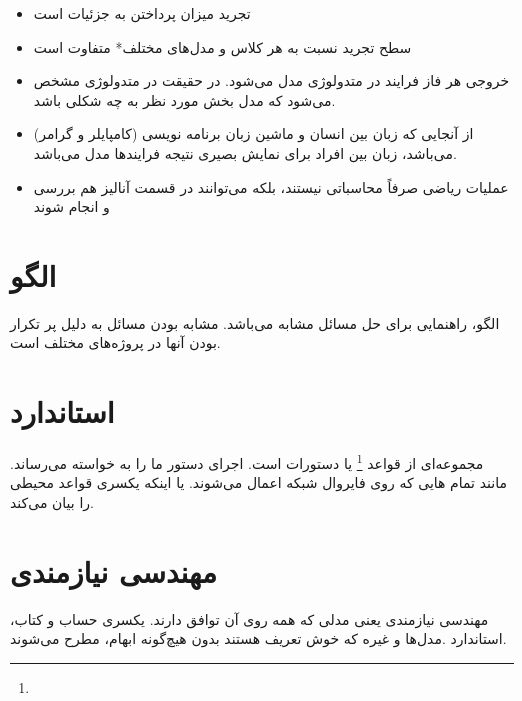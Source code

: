 \begin{itemize}
  \item تجرید میزان پرداختن به جزئیات است
  \item سطح تجرید نسبت به هر کلاس و مدل‌های مختلف* متفاوت است
  \item خروجی هر فاز فرایند در متدولوژی مدل می‌شود. در حقیقت در متدولوژی مشخص
  می‌شود که مدل بخش مورد نظر به چه شکلی باشد.
  \item از آنجایی که زبان بین انسان و ماشین زبان برنامه نویسی (کامپایلر و گرامر)
  می‌باشد، زبان بین افراد برای نمایش بصیری نتیجه فرایند‌ها مدل می‌باشد.
  \item عملیات ریاضی صرفاً محاسباتی نیستند، بلکه می‌توانند در قسمت آنالیز هم
  بررسی و انجام شوند
\end{itemize}

\section{الگو}

الگو، راهنمایی برای حل مسائل مشابه می‌باشد. مشابه بودن مسائل به دلیل پر تکرار
بودن آنها در پروژه‌های مختلف است.

\section{استاندارد}

مجموعه‌ای از قواعد \footnote{} یا دستورات است. اجرای دستور ما را به
خواسته می‌رساند. مانند تمام  هایی که روی فایروال شبکه اعمال می‌شوند. یا
اینکه یکسری قواعد محیطی را بیان می‌کند.

\section{مهندسی نیازمندی}

مهندسی نیازمندی یعنی مدلی که همه روی آن توافق دارند. یکسری حساب و کتاب،
استاندارد .مدل‌ها و غیره که خوش تعریف هستند بدون هیچ‌گونه ابهام، مطرح می‌شوند.



